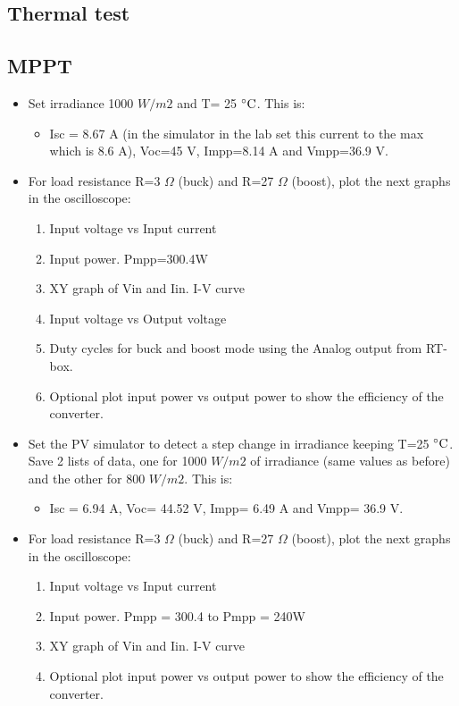 \subsection{Thermal test}

\subsection{MPPT}

\begin{itemize}	
	\item Set irradiance 1000 $W /m2$ and T= 25 $\decC$. This is: 
		\begin{itemize}
		\item Isc = 8.67 A (in the simulator in the lab set this current to the max which is 8.6 A), Voc=45 V, Impp=8.14 A and Vmpp=36.9 V.
		\end{itemize} 
	\item For load resistance R=3 $\Omega$ (buck) and R=27 $\Omega$ (boost), plot the next graphs in the oscilloscope:
		\begin{enumerate}
		\item Input voltage vs Input current 
		\item Input power. Pmpp=300.4W
		\item XY graph of Vin and Iin. I-V curve
		\item Input voltage vs Output voltage
		\item Duty cycles for buck and boost mode using the Analog output from RT-box. 
		\item Optional plot input power vs output power to show the efficiency of the converter.
		\end{enumerate}
	
	\item Set the PV simulator to detect a step change in irradiance keeping T=25 $\decC$. Save 2 lists of data, one for 1000 $W /m2$ of irradiance (same values as before) and the other for 800 $W /m2$. This is:
		\begin{itemize}
		\item Isc = 6.94 A, Voc= 44.52 V, Impp= 6.49 A and Vmpp= 36.9 V.
      	\end{itemize} 
      \item For load resistance R=3 $\Omega$ (buck) and R=27 $\Omega$ (boost), plot the next graphs in the oscilloscope:
      \begin{enumerate}
      	\item Input voltage vs Input current 
      	\item Input power. Pmpp = 300.4 to Pmpp = 240W
      	\item XY graph of Vin and Iin. I-V curve
      	\item Optional plot input power vs output power to show the efficiency of the converter.
      \end{enumerate}
  

\end{itemize}
